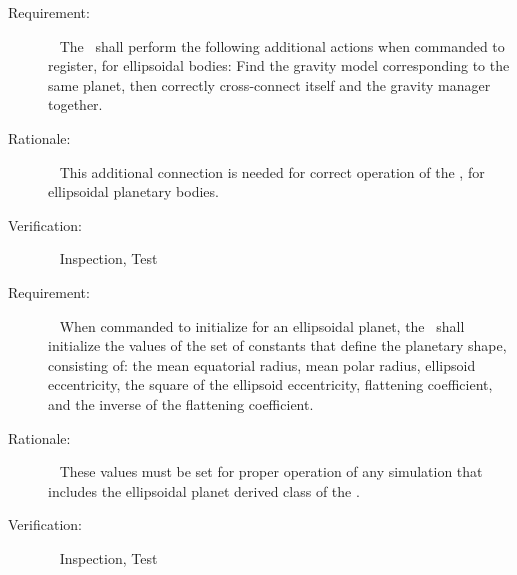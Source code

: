 \label{reqt:func_ellip_register_model}
\begin{description}
  \item[Requirement:]\ \newline
    The \planetDesc\ shall perform the following additional actions
    when commanded to register, for ellipsoidal bodies:
    Find the gravity model corresponding to the same planet, then
    correctly cross-connect itself and the gravity manager together.

  \item[Rationale:]\ \newline
    This additional connection is needed for correct operation of the
    \planetDesc, for ellipsoidal planetary bodies.

  \item[Verification:]\ \newline
    Inspection, Test
\end{description}

\label{reqt:func_init_ellip_constants}
\begin{description}
  \item[Requirement:]\ \newline
    When commanded to initialize for an ellipsoidal planet, the \planetDesc\
    shall initialize the values of the set of constants that define the
    planetary shape, consisting of: the mean equatorial radius, mean polar
    radius, ellipsoid eccentricity, the square of the ellipsoid eccentricity,
    flattening coefficient, and the inverse of the flattening coefficient.
  \item[Rationale:]\ \newline
    These values must be set for proper operation of any simulation
    that includes the ellipsoidal planet derived class of the \planetDesc.

  \item[Verification:]\ \newline
    Inspection, Test
\end{description}

%
%
%
%
%



